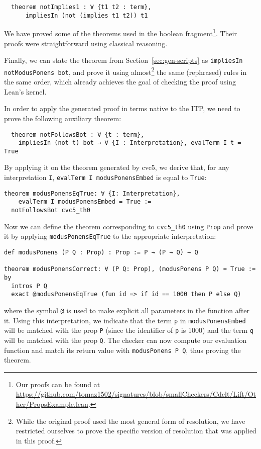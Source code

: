 \begin{verbatim}
  theorem notImplies1 : ∀ {t1 t2 : term},
      impliesIn (not (implies t1 t2)) t1
\end{verbatim}

We have proved some of the theorems used in the boolean fragment\footnote{Our proofs can be found at \url{https://github.com/tomaz1502/signatures/blob/smallCheckers/Cdclt/Lift/Other/PropsExample.lean}.}. Their proofs
were straightforward using classical reasoning.

Finally, we can state the theorem from Section~\ref{sec:gen-scripts} as
\texttt{impliesIn notModusPonens bot}, and prove it using almost\footnote{While the original proof used the most general form of resolution, we have restricted ourselves to prove the specific version of resolution that was applied in this proof.} the same
(rephrased) rules in the same order, which already achieves the goal
of checking the proof using Lean's kernel.

In order to apply the generated proof in terms native to the ITP, we need
to prove the following auxiliary theorem:

\begin{verbatim}
  theorem notFollowsBot : ∀ {t : term},
    impliesIn (not t) bot → ∀ {I : Interpretation}, evalTerm I t = True
\end{verbatim}

By applying it on the theorem generated by cvc5, we derive that, for any
interpretation \texttt{I}, \texttt{evalTerm I modusPonensEmbed} is equal
to \texttt{True}:

\begin{verbatim}
theorem modusPonensEqTrue: ∀ {I: Interpretation},
    evalTerm I modusPonensEmbed = True :=
  notFollowsBot cvc5_th0
\end{verbatim}

Now we can define the theorem corresponding to \texttt{cvc5\_th0} using
\texttt{Prop} and prove it by applying \texttt{modusPonensEqTrue} to
the appropriate interpretation:

\begin{verbatim}
def modusPonens (P Q : Prop) : Prop := P → (P → Q) → Q

theorem modusPonensCorrect: ∀ (P Q: Prop), (modusPonens P Q) = True := by
  intros P Q
  exact @modusPonensEqTrue (fun id => if id == 1000 then P else Q)
\end{verbatim}
where the symbol \texttt{@} is used to make explicit all parameters
in the function after it. Using this interpretation, we indicate
that the term \texttt{p} in \texttt{modusPonensEmbed}
will be matched with the prop \texttt{P} (since the identifier of \texttt{p}
is 1000) and the term \texttt{q} will be matched with the prop \texttt{Q}.
The checker can now compute our evaluation function and
match its return value with \texttt{modusPonens P Q}, thus proving the theorem.

